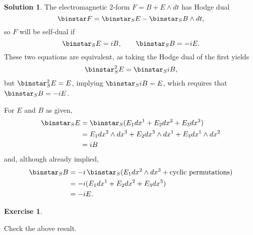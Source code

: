 \documentclass[11pt, a4paper]{report}
\theoremstyle{definition}
\newtheorem{exercise}{Exercise}[part]
\newtheorem{solution}{Solution}[part]
\newenvironment{ex}{\begin{exercise}}{\end{exercise}\pagebreak[1]}
\newenvironment{sol}{\begin{solution}}{\end{solution}\pagebreak[3]}
\renewcommand*{\star}{\ensuremath\mathop{}\mathopen\binstar\mathord{}}
\begin{document}
\begin{sol}

The electromagnetic 2-form $F = B + E \wedge dt$ has Hodge dual
\[
    \star F = \star_S E - \star_S B \wedge dt,
\]
so $F$ will be self-dual if
\[
    \star_S E = iB, \qquad \star_S B = -iE.
\]
These two equations are equivalent, as taking the Hodge dual of the first yields
\[
    \star_S^2 E = \star_S iB,
\]
but $\star_S^2 E = E$, implying $\star_S iB = E$, which requires that $\star_S B = -iE$.

For $E$ and $B$ as given,
\begin{align*}
    \star_S E &= \star_S (E_1 dx^1 + E_2 dx^2 + E_3 dx^3) \\
        &= E_1 dx^2 \wedge dx^3 + E_2 dx^3 \wedge dx^1 + E_3 dx^1 \wedge dx^2 \\
        &= iB
\end{align*}
and, although already implied,
\begin{align*}
    \star_S B &= -i \star_S (E_1 dx^2 \wedge dx^3 + \text{cyclic permutations}) \\
              &= -i (E_1 dx^1 + E_2 dx^2 + E_3 dx^3) \\
              &= -iE.
\end{align*}

\end{sol}

\begin{ex}\label{ex:planewavemaxwelleq2}

Check the above result.

\end{ex}
\end{document}

